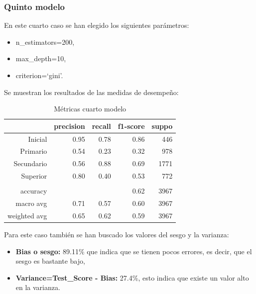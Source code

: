 \documentclass[a4paper]{article}
\begin{document}
        \subsubsection{Quinto modelo}

            En este cuarto caso se han elegido los siguientes parámetros:
            \begin{itemize}
                \item n\_estimators=200,
                \item max\_depth=10,
                \item criterion=`gini'.
            \end{itemize}

            Se muestran los resultados de las medidas de desempeño:
            \begin{table}[H]
                \centering
                \begin{tabular}{rrrrr}
                    \toprule
                    ~ & precision & recall & f1-score & suppo \\ \midrule
                    Inicial    & 0.95 & 0.78 & 0.86 & 446 \\
                    Primario   & 0.54 & 0.23 & 0.32 & 978 \\
                    Secundario & 0.56 & 0.88 & 0.69 & 1771 \\
                    Superior   & 0.80 & 0.40 & 0.53 & 772 \\
                    & & & & \\
                    accuracy & & & 0.62 & 3967 \\
                    macro avg & 0.71 & 0.57 & 0.60 & 3967 \\
                    weighted avg & 0.65 & 0.62 & 0.59 & 3967 \\
                    \bottomrule
                \end{tabular}
                \caption{Métricas cuarto modelo}
                \label{Fourth model metrics}
            \end{table}

            Para este caso también se han buscado los valores del sesgo y la varianza:
            \begin{itemize}
                \item \textbf{Bias o sesgo:} 89.11\% que indica que se tienen pocos errores, es decir, que el sesgo es bastante bajo,
                \item \textbf{Variance=Test\_Score - Bias:} 27.4\%, esto indica que existe un valor alto en la varianza.
             \end{itemize}
\end{document}
